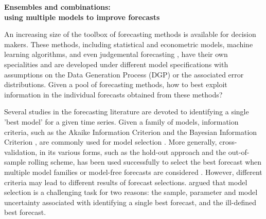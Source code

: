 \documentclass[11pt]{article}
\begin{document}
\def\spacingset#1{\renewcommand{\baselinestretch}%
{#1}\small\normalsize} \spacingset{1}

\begin{center}
{\bf\Large Ensembles and combinations: \\using multiple models to improve forecasts}
\end{center}


\bigskip


\spacingset{1.5} 


An increasing size of the toolbox of forecasting methods is available for decision makers. These methods, including statistical and econometric models, machine learning algorithms, and even judgemental forecasting \citep[see an encyclopedic overview by][]{petropoulos2020forecasting}, have their own specialities and are developed under different model specifications with assumptions on the Data Generation Process (DGP) or the associated error distributions. Given a pool of forecasting methods, how to best exploit information in the individual forecasts obtained from these methods?

Several studies in the forecasting literature are devoted to identifying a single 'best model' for a given time series. Given a family of models, information criteria, such as the Akaike Information Criterion \citep[AIC,][]{akaike1998information} and the Bayesian Information Criterion \citep[BIC,][]{schwarz1978estimating}, are commonly used for model selection \citep[e.g.,][]{qi2001investigation,billah2005empirical,yang2005can}. More generally, cross-validation, in its various forms, such as the hold-out approach and the out-of-sample rolling scheme, has been used successfully to select the best forecast when multiple model families or model-free forecasts are considered \citep[e.g.,][]{kohavi1995study,poler2011forecasting,fildes2015simple,inoue2017rolling,talagala2018meta}. However, different criteria may lead to different results of forecast selections. \cite{Kourentzes2019-na} argued that model selection is a challenging task for two reasons: the sample, parameter and model uncertainty associated with identifying a single best forecast, and the ill-defined best forecast.
\end{document}
